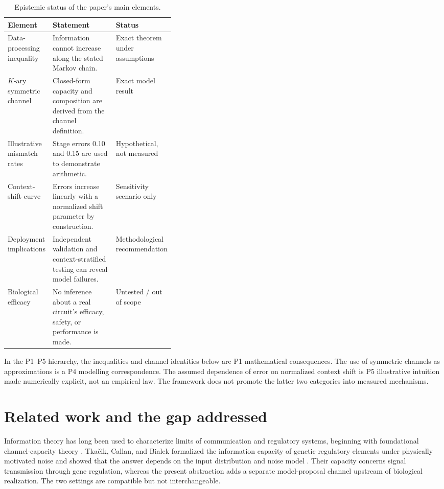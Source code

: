 \documentclass[11pt]{article}
\begin{document}
\begin{table}[H]
\centering\small
\caption{Epistemic status of the paper's main elements.}
\begin{tabularx}{\linewidth}{p{0.18\linewidth} X p{0.20\linewidth}}
\toprule
Element & Statement & Status \\
\midrule
Data-processing inequality & Information cannot increase along the stated Markov chain. & Exact theorem under assumptions \\
$K$-ary symmetric channel & Closed-form capacity and composition are derived from the channel definition. & Exact model result \\
Illustrative mismatch rates & Stage errors 0.10 and 0.15 are used to demonstrate arithmetic. & Hypothetical, not measured \\
Context-shift curve & Errors increase linearly with a normalized shift parameter by construction. & Sensitivity scenario only \\
Deployment implications & Independent validation and context-stratified testing can reveal model failures. & Methodological recommendation \\
Biological efficacy & No inference about a real circuit's efficacy, safety, or performance is made. & Untested / out of scope \\
\bottomrule
\end{tabularx}
\end{table}

In the P1--P5 hierarchy, the inequalities and channel identities below are P1 mathematical consequences. The use of symmetric channels as approximations is a P4 modelling correspondence. The assumed dependence of error on normalized context shift is P5 illustrative intuition made numerically explicit, not an empirical law. The framework does not promote the latter two categories into measured mechanisms.

\section{Related work and the gap addressed}
Information theory has long been used to characterize limits of communication and regulatory systems, beginning with foundational channel-capacity theory \parencite{Shannon1948}. Tka\v{c}ik, Callan, and Bialek formalized the information capacity of genetic regulatory elements under physically motivated noise and showed that the answer depends on the input distribution and noise model \parencite{Tkacik2008}. Their capacity concerns signal transmission through gene regulation, whereas the present abstraction adds a separate model-proposal channel upstream of biological realization. The two settings are compatible but not interchangeable.
\end{document}
